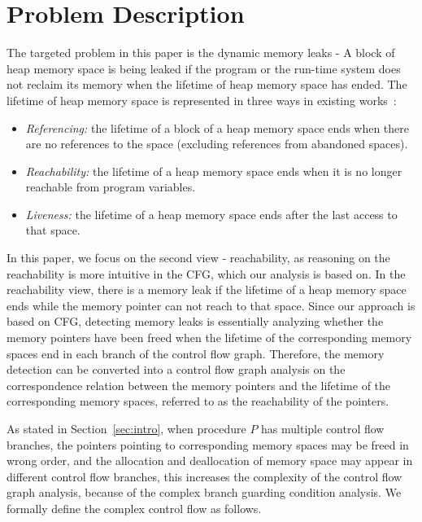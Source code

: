 \section{Problem Description}\label{sec:description}
The targeted problem in this paper is the dynamic memory leaks - A block of heap memory space is being leaked if the program or the run-time system does not reclaim its memory when the lifetime of heap memory space has ended. 
The lifetime of heap memory space is represented in three ways in existing works~\cite{OR06}: 
\begin{itemize}
\item
\textit{Referencing:} the lifetime of a block of a heap memory space ends when there are no references to the space (excluding references from abandoned spaces).
\item 
\textit{Reachability:} the lifetime of a heap memory space ends when it is no longer reachable from program variables.
\item 
\textit{Liveness:} the lifetime of a heap memory space ends after the last access to that space.
\end{itemize}
In this paper, we focus on the second view - reachability, as reasoning on the reachability is more intuitive in the CFG, which our analysis is based on.
In the reachability view, there is a memory leak if the lifetime of a heap memory space ends while the memory pointer can not reach to that space.
Since our approach is based on CFG, detecting memory leaks is essentially analyzing whether the memory pointers have been freed when the lifetime of the corresponding memory spaces end in each branch of the control flow graph. Therefore, the memory detection can be converted into a control flow graph analysis on the correspondence relation between the memory pointers and the lifetime of the corresponding memory spaces, referred to as the reachability of the pointers.

As stated in Section~\ref{sec:intro}, when procedure $P$ has multiple control flow branches, the pointers pointing to corresponding memory spaces may be freed in wrong order, and the allocation and deallocation of memory space may appear in different control flow branches, this increases the complexity of the control flow graph analysis, because of the complex branch guarding condition analysis. %
We formally define the complex control flow as follows.

